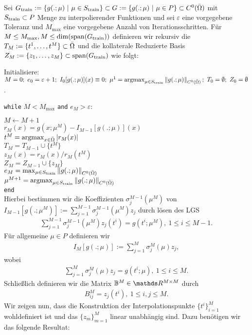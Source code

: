Sei $G_{\operatorname{train}} := \left\{g(.;\mu)~|~\mu\in S_{\operatorname{train}}\right\} \subset G := \left\{g(.;\mu)~|~\mu\in P\right\}\subset C^0(\bar{\Omega})$ mit $S_{\operatorname{train}}\subset P$ Menge zu interpolierender Funktionen und sei $\varepsilon$ eine vorgegebene Toleranz und $M_{\max}$ eine vorgegebene Anzahl von Iterationsschritten.
Für $M\le M_{\max},M\le \dim (\operatorname{span} (G_{\operatorname{train}}))$ definieren wir rekursiv die  $T_M := \{t^1, \dots ,t^M\}\subset \bar{\Omega}$ und die kollaterale Reduzierte Basis $Z_M := \{z_1, \dots ,z_M\}\subset \operatorname{span} (G_{\operatorname{train}})$ wie folgt:

Initialisiere:
$M=0;~e_0=\varepsilon + 1;~ I_0[g(.;\mu)](x) \equiv 0;~ \mu^1 = \operatorname{argmax}_{\mu\in S_{\operatorname{train}}} \left\Vert g(.;\mu)\right\Vert_{C^0(\bar{\Omega})};~ T_0=\emptyset;~Z_0=\emptyset$.

\texttt{while} $M<M_{\max}$ \texttt{and} $e_M > \varepsilon$:

\qquad $M \leftarrow M+1$\\
\qquad $r_M(x) = g(x;\mu^M) - I_{M-1}[g(.;\mu)](x)$\\
\qquad $t^M = \operatorname{argmax}_{x\in \bar{\Omega}} \left\vert r_M(x)\right\vert$\\
\qquad $T_M = T_{M-1} \cup \{t^M\}$\\
\qquad $z_M(x) = r_M(x) / r_M(t^M)$\\
\qquad $Z_M = Z_{M-1} \cup \{z_M\}$\\
\qquad $e_M = \max_{\mu\in S_{\operatorname{train}}} \left\Vert g(.;\mu)\right\Vert_{C^0(\bar{\Omega})}$\\
\qquad $\mu^{M+1} = \operatorname{argmax}_{\mu\in S_{\operatorname{train}}} \left\Vert g(.;\mu)\right\Vert_{C^0(\bar{\Omega})}$\\
\texttt{end}\\

Hierbei bestimmen wir die Koeffizienten $\sigma_j^{M-1}(\mu^M)$ von $I_{M-1}[g(.;\mu^M)] := \sum_{j=1}^{M-1} \sigma_j^{M-1}(\mu^M) z_j$ durch lösen des LGS
\begin{align}
\sum_{j=1}^{M-1} \sigma_j^{M-1}(\mu^M) z_j(t^i) = g(t^i;\mu^M),~ 1\le i\le M-1.
\end{align}
Für allgemeine $\mu\in P$ definieren wir
\begin{align}
I_M[g(.;\mu)]:= \sum_{j=1}^{M} \sigma_j^{M}(\mu) z_j,
\end{align}
wobei
\begin{align}
\sum_{j=1}^{M} \sigma_j^{M}(\mu) z_j = g(t^i;\mu),~ 1\le i \le M.
\end{align}
Schließlich definieren wir die Matrix $\mathbb{B}^M\in \R^{M\times M}$ durch
\begin{align}
B_{ij}^M = z_j(t^i),~ 1\le i,j \le M.
\end{align}
Wir zeigen nun, dass die Konstruktion der Interpolationspunkte $\{t^i\}_{i=1}^M$ wohldefiniert ist und das $\{z_m\}_{m=1}^M$ linear unabhängig sind.
Dazu benötigen wir das folgende Resultat:

